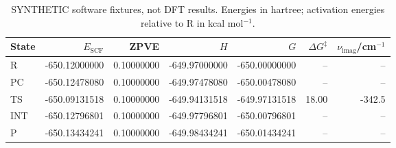 \begin{table}[htbp]
\centering
\caption{SYNTHETIC software fixtures, not DFT results. Energies in hartree; activation energies relative to R in kcal mol$^{-1}$.}
\label{tab:qm-autobridge}
\begin{tabular}{lrrrrrr}
\toprule
State & $E_{\mathrm{SCF}}$ & ZPVE & $H$ & $G$ & $\Delta G^\ddagger$ & $\nu_{\mathrm{imag}}$/cm$^{-1}$ \\
\midrule
R & -650.12000000 & 0.10000000 & -649.97000000 & -650.00000000 & -- & -- \\
PC & -650.12478080 & 0.10000000 & -649.97478080 & -650.00478080 & -- & -- \\
TS & -650.09131518 & 0.10000000 & -649.94131518 & -649.97131518 & 18.00 & -342.5 \\
INT & -650.12796801 & 0.10000000 & -649.97796801 & -650.00796801 & -- & -- \\
P & -650.13434241 & 0.10000000 & -649.98434241 & -650.01434241 & -- & -- \\
\bottomrule
\end{tabular}
\end{table}
